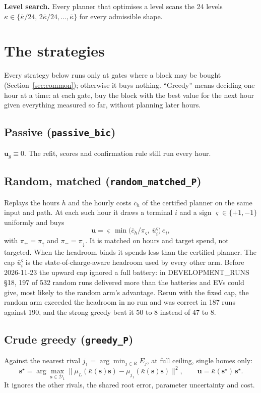 \documentclass[11pt]{article}
\theoremstyle{definition}
\newcommand{\bu}{\bm{u}}
\newcommand{\bs}{\bm{s}}
\newcommand{\cD}{\mathcal{D}}
\newcommand{\code}[1]{\texttt{#1}}
\begin{document}
{\textbf{Level search.} Every planner that optimises a level scans the 24 levels $\kappa\in\{\bar\kappa/24,\,2\bar\kappa/24,\dots,\bar\kappa\}$ for every admissible shape.

\section{The strategies}\label{sec:strategies}

Every strategy below runs only at gates where a block may be bought (Section~\ref{sec:common}); otherwise it buys nothing. ``Greedy'' means deciding one hour at a time: at each gate, buy the block with the best value for the next hour given everything measured so far, without planning later hours.

\subsection{Passive (\code{passive\_bic})}
$\bu_g\equiv0$. The refit, scores and confirmation rule still run every hour.

\subsection{Random, matched (\code{random\_matched\_P})}
Replays the hours $h$ and the hourly costs $\bar c_h$ of the certified planner on the same input and path. At each such hour it draws a terminal $i$ and a sign $\varsigma\in\{+1,-1\}$ uniformly and buys
\begin{equation}
  \bu=\varsigma\,\min\!\big(\bar c_h/\pi_\varsigma,\ \bar u_i^{\varsigma}\big)\,e_i ,
\end{equation}
with $\pi_{+}=\pi_\uparrow$ and $\pi_{-}=\pi_\downarrow$. It is matched on hours and target spend, not targeted. When the headroom binds it spends less than the certified planner. The cap $\bar u_i^{\varsigma}$ is the state-of-charge-aware headroom used by every other arm. Before 2026-11-23 the upward cap ignored a full battery: in DEVELOPMENT\_RUNS \S18, 197 of 532 random runs delivered more than the batteries and EVs could give, most likely to the random arm's advantage. Rerun with the fixed cap, the random arm exceeded the headroom in no run and was correct in 187 runs against 190, and the strong greedy beat it 50 to 8 instead of 47 to 8.

\subsection{Crude greedy (\code{greedy\_P})}
Against the nearest rival $j_1=\arg\min_{j\in R}E_j$, at full ceiling, single homes only:
\begin{equation}
  \bs^\star=\arg\max_{\bs\in\cD_1}\big\|\mu_L(\bar\kappa(\bs)\bs)-\mu_{j_1}(\bar\kappa(\bs)\bs)\big\|^2,\qquad \bu=\bar\kappa(\bs^\star)\,\bs^\star .
\end{equation}
It ignores the other rivals, the shared root error, parameter uncertainty and cost.

}
\end{document}
